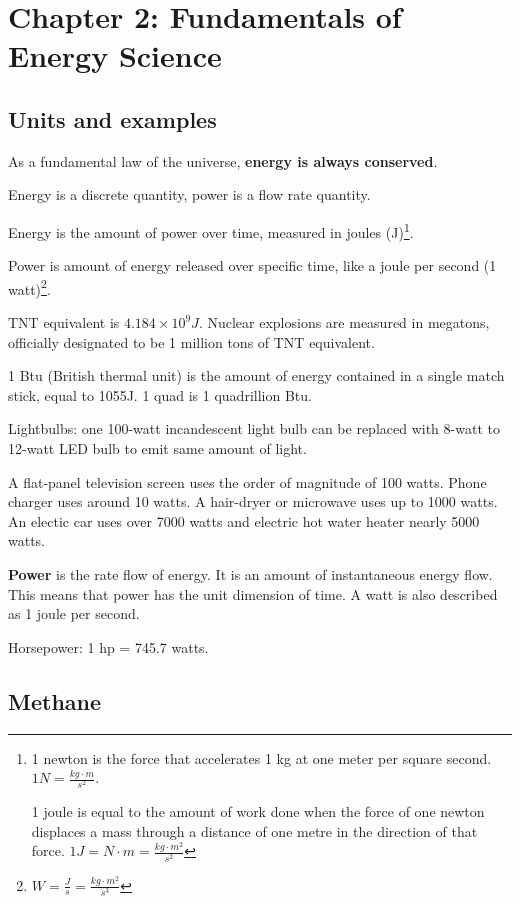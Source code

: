 \section{Chapter 2: Fundamentals of Energy Science}

\subsection{Units and examples}

As a fundamental law of the universe, \textbf{energy is always conserved}.

Energy is a discrete quantity, power is a flow rate quantity.

Energy is the amount of power over time, measured in joules (J)\footnote{
	1 newton is the force that accelerates 1 kg at one meter per square
	second. $1N = \frac{kg \cdot m}{s^2}$.

	1 joule is equal to the amount of work done when the force of one
	newton displaces a mass through a distance of one metre in the
	direction of that force. $1J = N \cdot m = \frac{kg \cdot m^2}{s^2}$
}.

Power is amount of energy released over specific time, like a joule per second
(1 watt)\footnote{
	$W = \frac{J}{s} = \frac{kg \cdot m^2}{s^3}$
}.

TNT equivalent is $4.184 \times 10^9J$. Nuclear explosions are measured in
megatons, officially designated to be 1 million tons of TNT equivalent.

1 Btu (British thermal unit) is the amount of energy contained in a single
match stick, equal to 1055J. 1 quad is 1 quadrillion Btu.

Lightbulbs: one 100-watt incandescent light bulb can be replaced with
8-watt to 12-watt LED bulb to emit same amount of light.

A flat-panel television screen uses the order of magnitude of 100 watts. Phone
charger uses around 10 watts. A hair-dryer or microwave uses up to 1000 watts.
An electic car uses over 7000 watts and electric hot water heater nearly
5000 watts.

\textbf{Power} is the rate flow of energy. It is an amount of instantaneous
energy flow. This means that power has the unit dimension of time. A watt is
also described as 1 joule per second.

Horsepower: 1 hp = 745.7 watts.

\subsection{Methane}

